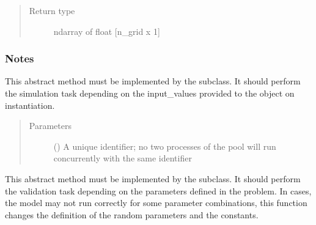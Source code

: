 \documentclass[letterpaper,10pt,english,openany,oneside]{sphinxmanual}
\begin{document}
\begin{fulllineitems}
\begin{quote}
\begin{description}
\item[{Return type}] \leavevmode
ndarray of float {[}n\_grid x 1{]}

\end{description}\end{quote}
\subsubsection*{Notes}

\begin{figure}[htbp]
\centering

\noindent{}
\end{figure}

\begin{fulllineitems}
\label{\detokenize{pygpc.testfunctions:pygpc.testfunctions.testfunctions.HyperbolicTangent.simulate}}
This abstract method must be implemented by the subclass.
It should perform the simulation task depending on the input\_values provided to the object on instantiation.
\begin{quote}\begin{description}
\item[{Parameters}] \leavevmode
{} () \textendash{} A unique identifier; no two processes of the pool will run concurrently with the same identifier

\end{description}\end{quote}

\end{fulllineitems}


\begin{fulllineitems}
\label{\detokenize{pygpc.testfunctions:pygpc.testfunctions.testfunctions.HyperbolicTangent.validate}}
This abstract method must be implemented by the subclass.
It should perform the validation task depending on the parameters defined in the problem.
In cases, the model may not run correctly for some parameter combinations, this function changes the definition
of the random parameters and the constants.

\end{fulllineitems}


\end{fulllineitems}
\end{document}

